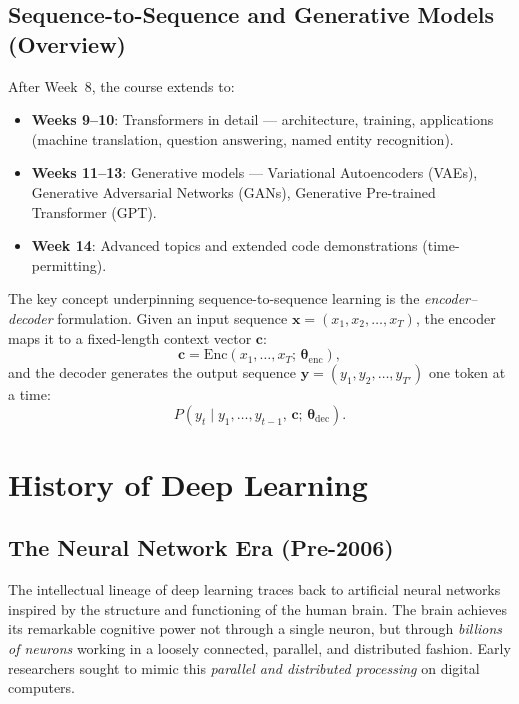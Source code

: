 \documentclass[12pt,a4paper]{article}
\begin{document}
\subsection{Sequence-to-Sequence and Generative Models (Overview)}
\label{subsec:seq2gen}

After Week~8, the course extends to:
\begin{itemize}
  \item \textbf{Weeks 9--10}: Transformers in detail — architecture, training,
        applications (machine translation, question answering, named entity
        recognition).
  \item \textbf{Weeks 11--13}: Generative models — Variational Autoencoders
        (VAEs), Generative Adversarial Networks (GANs), Generative Pre-trained
        Transformer (GPT).
  \item \textbf{Week 14}: Advanced topics and extended code demonstrations
        (time-permitting).
\end{itemize}

The key concept underpinning sequence-to-sequence learning is the
\emph{encoder--decoder} formulation.  Given an input sequence
$\mathbf{x} = (x_1, x_2, \ldots, x_T)$, the encoder maps it to a fixed-length
context vector $\mathbf{c}$:
\begin{equation}
  \label{eq:encoder}
  \mathbf{c} = \mathrm{Enc}(x_1, \ldots, x_T;\,\boldsymbol{\theta}_\mathrm{enc}),
\end{equation}
and the decoder generates the output sequence
$\mathbf{y} = (y_1, y_2, \ldots, y_{T'})$ one token at a time:
\begin{equation}
  \label{eq:decoder}
  P(y_t \mid y_1,\ldots,y_{t-1},\,\mathbf{c};\,\boldsymbol{\theta}_\mathrm{dec}).
\end{equation}

\section{History of Deep Learning}
\label{sec:history}

\subsection{The Neural Network Era (Pre-2006)}
\label{subsec:pre2006}

The intellectual lineage of deep learning traces back to artificial neural
networks inspired by the structure and functioning of the human brain.  The
brain achieves its remarkable cognitive power not through a single neuron, but
through \emph{billions of neurons} working in a loosely connected,
parallel, and distributed fashion.  Early researchers sought to mimic this
\emph{parallel and distributed processing} on digital computers.
\end{document}
